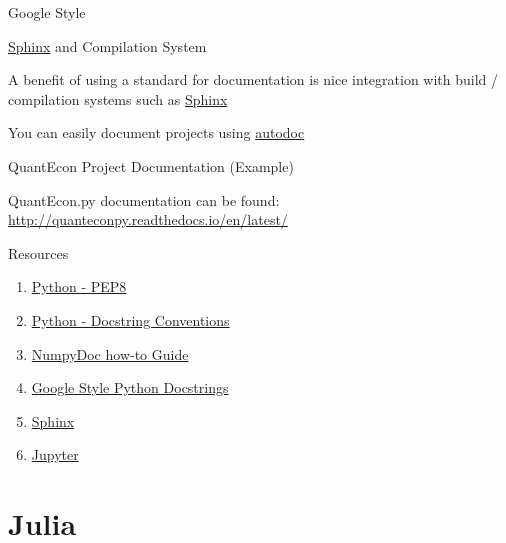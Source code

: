 \documentclass{beamer}
\begin{document}
\begin{frame}{Google Style}

\end{frame}


\begin{frame}{\href{http://www.sphinx-doc.org/en/stable/}{Sphinx} and Compilation System}

A benefit of using a standard for documentation is nice integration with build / compilation systems such as \href{http://www.sphinx-doc.org/en/stable/}{Sphinx}

You can easily document projects using \href{http://www.sphinx-doc.org/en/stable/ext/autodoc.html}{autodoc}

\end{frame}

\begin{frame}{QuantEcon Project Documentation (Example)}

QuantEcon.py documentation can be found: \url{http://quanteconpy.readthedocs.io/en/latest/}

\end{frame}

\begin{frame}{Resources}
\begin{enumerate}
\item \href{https://www.python.org/dev/peps/pep-0008/}{Python - PEP8}
\item \href{https://www.python.org/dev/peps/pep-0257/}{Python - Docstring Conventions}
\item \href{https://github.com/numpy/numpy/blob/master/doc/HOWTO_DOCUMENT.rst.txt}{NumpyDoc how-to Guide}
\item \href{http://sphinxcontrib-napoleon.readthedocs.io/en/latest/example_google.html}{Google Style Python Docstrings}
\item \href{http://www.sphinx-doc.org/en/stable/}{Sphinx}
\item \href{http://jupyter.org/}{Jupyter}
\end{enumerate}
\end{frame}

\section{Julia}
\end{document}
